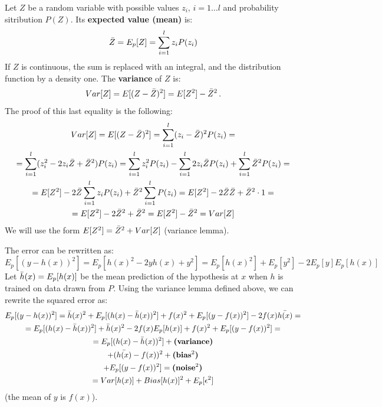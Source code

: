 Let $Z$ be a random variable with possible values $z_i, \, i = 1 \dots l$ and probability sitribution $P(Z)$. Its \textbf{expected value (mean)} is:
\begin{equation*}
    \Bar{Z} = E_p[Z] = \sum_{i=1}^l z_iP(z_i)
\end{equation*}
If $Z$ is continuous, the sum is replaced with an integral, and the distribution function by a density one. The \textbf{variance} of $Z$ is:
\begin{equation*}
    Var[Z] = E[(Z - \Bar{Z})^2] = E[Z^2] - \Bar{Z}^2 \,.
\end{equation*}
The proof of this last equality is the following:
\begin{gather*}
    Var[Z] = E[(Z - \Bar{Z})^2] = \sum_{i=1}^l (z_i - \Bar{Z})^2 P(z_i) = \\
    = \sum_{i=1}^l (z_i^2 - 2 z_i \Bar{Z} + \Bar{Z}^2) P(z_i) = \sum_{i=1}^l z_i^2 P(z_i) - \sum_{i=1}^l 2 z_i \Bar{Z} P(z_i) + \sum_{i=1}^l \Bar{Z}^2 P(z_i) = \\
     = E[Z^2] - 2\Bar{Z} \sum_{i=1}^l z_i P(z_i) + \Bar{Z}^2 \sum_{i=1}^l P(z_i) = E[Z^2] - 2 \Bar{Z} \Bar{Z} + \Bar{Z}^2 \cdot 1 = \\
     = E[Z^2] - 2 \Bar{Z}^2 + \Bar{Z}^2 = E[Z^2] - \Bar{Z}^2 = Var[Z]
\end{gather*}
We will use the form $E[Z^2] = \Bar{Z}^2 + Var[Z]$ (variance lemma).

The error can be rewritten as:
\begin{equation*}
    E_p[(y - h(x))^2] = E_p[h(x)^2 - 2yh(x) + y^2] = E_p[h(x)^2] + E_p[y^2] - 2E_p[y]E_p[h(x)]
\end{equation*}
Let $\Bar{h}(x) = E_p[h(x)]$ be the mean prediction of the hypothesis at $x$ when $h$ is trained on data drawn from $P$. Using the variance lemma defined above, we can rewrite the squared error as:
\begin{gather*}
    E_p[(y - h(x))^2] = \Bar{h}(x)^2 + E_p[(h(x) - \Bar{h}(x))^2] + f(x)^2 + E_p[(y - f(x))^2] - 2f(x)\Bar{h(x)} = \\
    = E_p[(h(x) - \Bar{h}(x))^2] + \Bar{h}(x)^2 - 2f(x)E_p[h(x)] + f(x)^2 + E_p[(y - f(x))^2] = \\
    = E_p[(h(x) - \Bar{h}(x))^2] + \textbf{(variance)}\\
    + (\Bar{h(x)} - f(x))^2 + \textbf{(bias$^2$)} \\
    + E_p[(y - f(x))^2] = \textbf{(noise$^2$)} \\
    = Var[h(x)] + Bias[h(x)]^2 + E_p[\epsilon^2]
\end{gather*}
(the mean of $y$ is $f(x)$).

